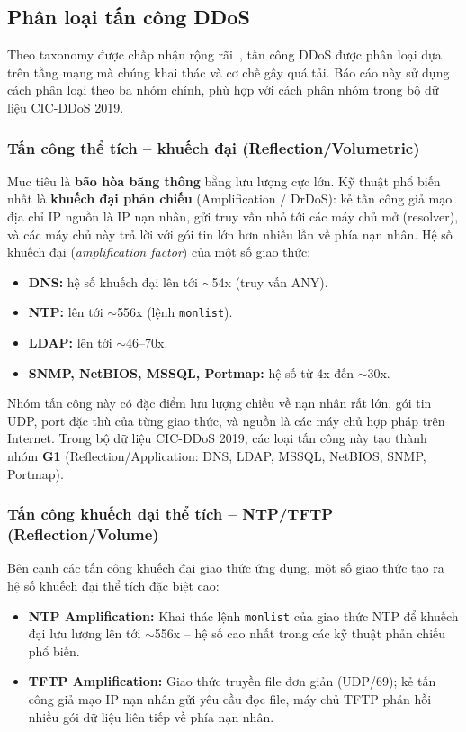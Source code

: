 \subsection{Phân loại tấn công DDoS}

Theo taxonomy được chấp nhận rộng rãi~\cite{mirkovic2004taxonomy,cicddos2019}, tấn công DDoS được phân loại dựa trên tầng mạng mà chúng khai thác và cơ chế gây quá tải. Báo cáo này sử dụng cách phân loại theo ba nhóm chính, phù hợp với cách phân nhóm trong bộ dữ liệu CIC-DDoS 2019.

\subsubsection{Tấn công thể tích -- khuếch đại (Reflection/Volumetric)}

Mục tiêu là \textbf{bão hòa băng thông} bằng lưu lượng cực lớn. Kỹ thuật phổ biến nhất là \textbf{khuếch đại phản chiếu} (Amplification / DrDoS): kẻ tấn công giả mạo địa chỉ IP nguồn là IP nạn nhân, gửi truy vấn nhỏ tới các máy chủ mở (resolver), và các máy chủ này trả lời với gói tin lớn hơn nhiều lần về phía nạn nhân. Hệ số khuếch đại (\textit{amplification factor}) của một số giao thức:
\begin{itemize}
    \item \textbf{DNS:} hệ số khuếch đại lên tới $\sim$54x (truy vấn ANY).
    \item \textbf{NTP:} lên tới $\sim$556x (lệnh \texttt{monlist}).
    \item \textbf{LDAP:} lên tới $\sim$46--70x.
    \item \textbf{SNMP, NetBIOS, MSSQL, Portmap:} hệ số từ 4x đến $\sim$30x.
\end{itemize}

Nhóm tấn công này có đặc điểm lưu lượng chiều về nạn nhân rất lớn, gói tin UDP, port đặc thù của từng giao thức, và nguồn là các máy chủ hợp pháp trên Internet. Trong bộ dữ liệu CIC-DDoS 2019, các loại tấn công này tạo thành nhóm \textbf{G1} (Reflection/Application: DNS, LDAP, MSSQL, NetBIOS, SNMP, Portmap).

\subsubsection{Tấn công khuếch đại thể tích -- NTP/TFTP (Reflection/Volume)}

Bên cạnh các tấn công khuếch đại giao thức ứng dụng, một số giao thức tạo ra hệ số khuếch đại thể tích đặc biệt cao:
\begin{itemize}
    \item \textbf{NTP Amplification:} Khai thác lệnh \texttt{monlist} của giao thức NTP để khuếch đại lưu lượng lên tới $\sim$556x -- hệ số cao nhất trong các kỹ thuật phản chiếu phổ biến.
    \item \textbf{TFTP Amplification:} Giao thức truyền file đơn giản (UDP/69); kẻ tấn công giả mạo IP nạn nhân gửi yêu cầu đọc file, máy chủ TFTP phản hồi nhiều gói dữ liệu liên tiếp về phía nạn nhân.
\end{itemize}

